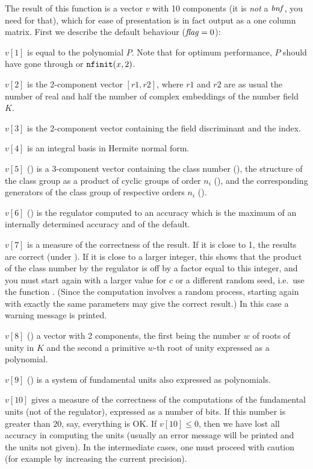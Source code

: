 The result of this function is a vector $v$ with 10 components (it is
\emph{not} a $\hbox{\it bnf\/}$, you need  for that), which for ease of
presentation is in fact output as a one column matrix. First we describe the
default behaviour ($\hbox{\it f\kern0pt lag\/}=0$):

 $v[1]$ is equal to the polynomial $P$. Note that for optimum performance,
$P$ should have gone through  or ${\tt nfinit}(x,2)$.

 $v[2]$ is the 2-component vector $[r1,r2]$, where $r1$ and $r2$ are as usual
the number of real and half the number of complex embeddings of the number
field $K$.

 $v[3]$ is the 2-component vector containing the field discriminant and the
index.

 $v[4]$ is an integral basis in Hermite normal form.

 $v[5]$ () is a 3-component vector containing the class number
(), the structure of the class group as a product of cyclic
groups of order $n_i$ (), and the corresponding generators
of the class group of respective orders $n_i$ ().

 $v[6]$ () is the regulator computed to an accuracy which is the
maximum of an internally determined accuracy and of the default.

 $v[7]$ is a measure of the correctness of the result. If it is close to 1,
the results are correct (under ). If it is close to a larger integer,
this shows that the product of the class number by the regulator is off by a
factor equal to this integer, and you must start again with a larger value
for $c$ or a different random seed, i.e.~use the function .
(Since the computation involves a random process, starting again with exactly
the same parameters may give the correct result.) In this case a warning
message is printed.

 $v[8]$ () a vector with 2 components, the first being the number
$w$ of roots of unity in $K$ and the second a primitive $w$-th root of unity
expressed as a polynomial.

 $v[9]$ () is a system of fundamental units also expressed as
polynomials.

 $v[10]$ gives a measure of the correctness of the computations of the
fundamental units (not of the regulator), expressed as a number of bits. If
this number is greater than $20$, say, everything is OK. If $v[10]\le0$,
then we have lost all accuracy in computing the units (usually an error
message will be printed and the units not given). In the intermediate cases,
one must proceed with caution (for example by increasing the current
precision).


